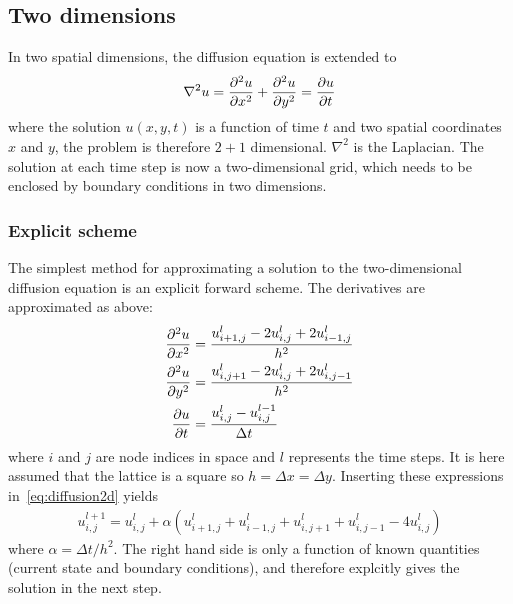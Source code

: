 \documentclass[aps,reprint]{revtex4-1}
\begin{document}
\subsection{Two dimensions}
In two spatial dimensions, the diffusion equation is extended to
\begin{align} \label{eq:diffusion2d}
  \nabla^2 u = \pdv[2]{u}{x} + \pdv[2]{u}{y} = \pdv{u}{t}
\end{align}
where the solution $u(x,y,t)$ is a function of time $t$ and two spatial coordinates $x$ and $y$,
the problem is therefore $2 + 1$ dimensional. $\nabla^2$ is the Laplacian. The solution at
each time step is now a two-dimensional grid, which needs to be enclosed by boundary
conditions in two dimensions.
\subsubsection{Explicit scheme}
The simplest method for approximating a solution to the two-dimensional diffusion
equation is an explicit forward scheme. The derivatives are approximated as above:
\begin{align*}
  \pdv[2]{u}{x} &= \frac{u^l_{i+1,j} - 2u^l_{i,j} + 2u^l_{i-1,j}}{h^2} \\
  \pdv[2]{u}{y} &= \frac{u^l_{i,j+1} - 2u^l_{i,j} + 2u^l_{i,j-1}}{h^2} \\
  \pdv{u}{t} &= \frac{u^l_{i,j} - u^{l-1}_{i,j}}{\Delta{t}}
\end{align*}
where $i$ and $j$ are node indices in space and $l$ represents the time steps. It
is here assumed that the lattice is a square so $h = \Delta{x} = \Delta{y}$. Inserting
these expressions in~\ref{eq:diffusion2d} yields
\begin{align*}
  u_{i,j}^{l+1} = u_{i,j}^l + \alpha (u^l_{i+1,j} + u^l_{i-1,j} + u_{i,j+1}^l + u_{i,j-1}^l - 4 u^l_{i,j})
\end{align*}
where $\alpha = \Delta{t}/h^2$. The right hand side is only a function of known
quantities (current state and boundary conditions), and therefore explcitly gives
the solution in the next step.
\end{document}
